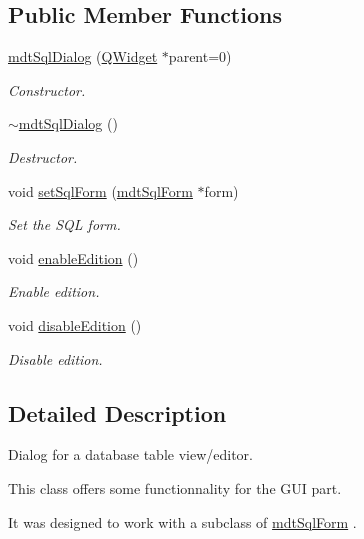\subsection*{Public Member Functions}
\begin{DoxyCompactItemize}
\item 
\hyperlink{classmdt_sql_dialog_a9588f53afba818d79ff0f2e9eaeed50f}{mdt\-Sql\-Dialog} (\hyperlink{class_q_widget}{Q\-Widget} $\ast$parent=0)
\begin{DoxyCompactList}\small\item\em Constructor. \end{DoxyCompactList}\item 
\hyperlink{classmdt_sql_dialog_a845d9f4eef1c590d5e854540e18b00a6}{$\sim$mdt\-Sql\-Dialog} ()
\begin{DoxyCompactList}\small\item\em Destructor. \end{DoxyCompactList}\item 
void \hyperlink{classmdt_sql_dialog_aa4b143efbe21073e1668d75cdf262a39}{set\-Sql\-Form} (\hyperlink{classmdt_sql_form}{mdt\-Sql\-Form} $\ast$form)
\begin{DoxyCompactList}\small\item\em Set the S\-Q\-L form. \end{DoxyCompactList}\item 
void \hyperlink{classmdt_sql_dialog_a47de595aa2a117cdc3eb5de4a6bbf8f5}{enable\-Edition} ()
\begin{DoxyCompactList}\small\item\em Enable edition. \end{DoxyCompactList}\item 
void \hyperlink{classmdt_sql_dialog_a22e77e80b419d9bb23703c253b1a246e}{disable\-Edition} ()
\begin{DoxyCompactList}\small\item\em Disable edition. \end{DoxyCompactList}\end{DoxyCompactItemize}


\subsection{Detailed Description}
Dialog for a database table view/editor. 

This class offers some functionnality for the G\-U\-I part.

It was designed to work with a subclass of \hyperlink{classmdt_sql_form}{mdt\-Sql\-Form} . 

